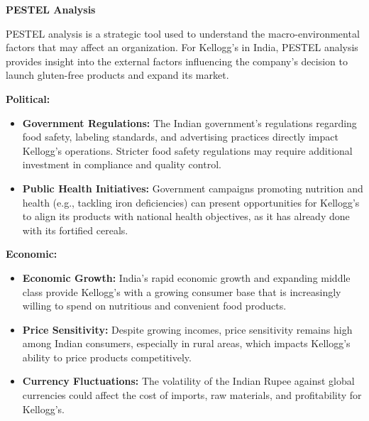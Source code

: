 \documentclass[10pt,a4paper]{book}
\begin{document}
\vspace{0.5cm}


\begin{center} 
    \textbf{PESTEL Analysis}
\end{center}

PESTEL analysis is a strategic tool used to understand the macro-environmental factors that may affect an organization. For Kellogg’s in India, PESTEL analysis provides insight into the external factors influencing the company’s decision to launch gluten-free products and expand its market.

\vspace{0.5cm}

\textbf{Political:}
\begin{itemize}
    \item \textbf{Government Regulations:} The Indian government’s regulations regarding food safety, labeling standards, and advertising practices directly impact Kellogg’s operations. Stricter food safety regulations may require additional investment in compliance and quality control.
    \item \textbf{Public Health Initiatives:} Government campaigns promoting nutrition and health (e.g., tackling iron deficiencies) can present opportunities for Kellogg’s to align its products with national health objectives, as it has already done with its fortified cereals.
\end{itemize}

\vspace{0.5cm}

\textbf{Economic:}
\begin{itemize}
    \item \textbf{Economic Growth:} India’s rapid economic growth and expanding middle class provide Kellogg’s with a growing consumer base that is increasingly willing to spend on nutritious and convenient food products.
    \item \textbf{Price Sensitivity:} Despite growing incomes, price sensitivity remains high among Indian consumers, especially in rural areas, which impacts Kellogg’s ability to price products competitively.
    \item \textbf{Currency Fluctuations:} The volatility of the Indian Rupee against global currencies could affect the cost of imports, raw materials, and profitability for Kellogg’s.
\end{itemize}

\vspace{0.5cm}
\end{document}
